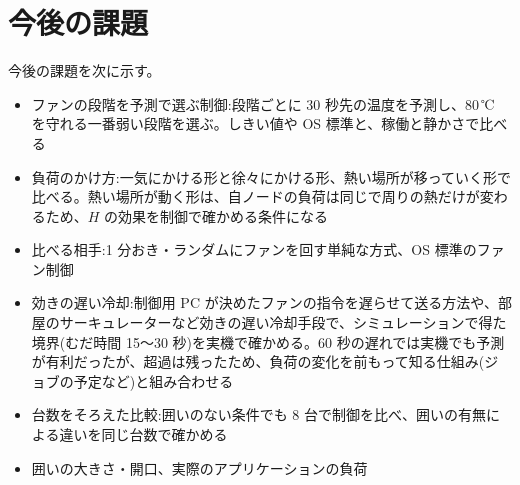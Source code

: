 \section{今後の課題}
今後の課題を次に示す。

\begin{itemize}
  \item ファンの段階を予測で選ぶ制御:段階ごとに 30 秒先の温度を予測し、80\,℃ を守れる一番弱い段階を選ぶ。しきい値や OS 標準と、稼働と静かさで比べる
  \item 負荷のかけ方:一気にかける形と徐々にかける形、熱い場所が移っていく形で比べる。熱い場所が動く形は、自ノードの負荷は同じで周りの熱だけが変わるため、$H$ の効果を制御で確かめる条件になる
  \item 比べる相手:1 分おき・ランダムにファンを回す単純な方式、OS 標準のファン制御
  \item 効きの遅い冷却:制御用 PC が決めたファンの指令を遅らせて送る方法や、部屋のサーキュレーターなど効きの遅い冷却手段で、シミュレーションで得た境界(むだ時間 15〜30 秒)を実機で確かめる。60 秒の遅れでは実機でも予測が有利だったが、超過は残ったため、負荷の変化を前もって知る仕組み(ジョブの予定など)と組み合わせる
  \item 台数をそろえた比較:囲いのない条件でも 8 台で制御を比べ、囲いの有無による違いを同じ台数で確かめる
  \item 囲いの大きさ・開口、実際のアプリケーションの負荷
\end{itemize}

